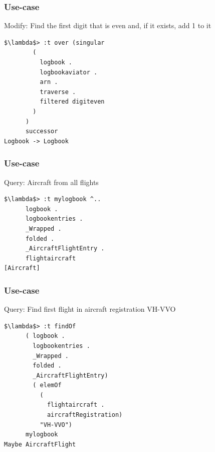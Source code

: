 

\begin{frame}[fragile]
\frametitle{Use-case}
\begin{block}{Modify: Find the first digit that is even and, if it exists, add 1 to it}
\begin{lstlisting}[style=haskell,basicstyle=\scriptsize\ttfamily,mathescape]
$\lambda$> :t over (singular
        ( 
          logbook .
          logbookaviator .
          arn .
          traverse .
          filtered digiteven
        )
      )
      successor
Logbook -> Logbook
\end{lstlisting}
\end{block}
\end{frame}

\begin{frame}[fragile]
\frametitle{Use-case}
\begin{block}{Query: Aircraft from all flights}
\begin{lstlisting}[style=haskell,basicstyle=\scriptsize\ttfamily,mathescape]
$\lambda$> :t mylogbook ^..
      logbook .
      logbookentries .
      _Wrapped .
      folded .
      _AircraftFlightEntry .
      flightaircraft
[Aircraft]
\end{lstlisting}
\end{block}
\end{frame}

\begin{frame}[fragile]
\frametitle{Use-case}
\begin{block}{Query: Find first flight in aircraft registration VH-VVO}
\begin{lstlisting}[style=haskell,basicstyle=\scriptsize\ttfamily,mathescape]
$\lambda$> :t findOf
      ( logbook . 
        logbookentries . 
        _Wrapped . 
        folded . 
        _AircraftFlightEntry)
        ( elemOf
          (
            flightaircraft . 
            aircraftRegistration)
          "VH-VVO")
      mylogbook
Maybe AircraftFlight
\end{lstlisting}
\end{block}
\end{frame}

